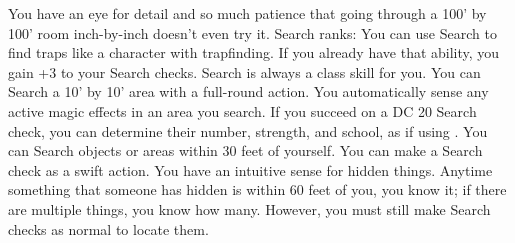 \skillfeat
{You have an eye for detail and so much patience that going through a 100' by 100' room inch-by-inch doesn't even try it.}
{Search ranks:}
{You can use Search to find traps like a character with trapfinding. If you already have that ability, you gain +3 to your Search checks. Search is always a class skill for you.}
{You can Search a 10' by 10' area with a full-round action.}
{You automatically sense any active magic effects in an area you search. If you succeed on a DC 20 Search check, you can determine their number, strength, and school, as if using .}
{You can Search objects or areas within 30 feet of yourself. You can make a Search check as a swift action.}
{You have an intuitive sense for hidden things. Anytime something that someone has hidden is within 60 feet of you, you know it; if there are multiple things, you know how many. However, you must still make Search checks as normal to locate them.}